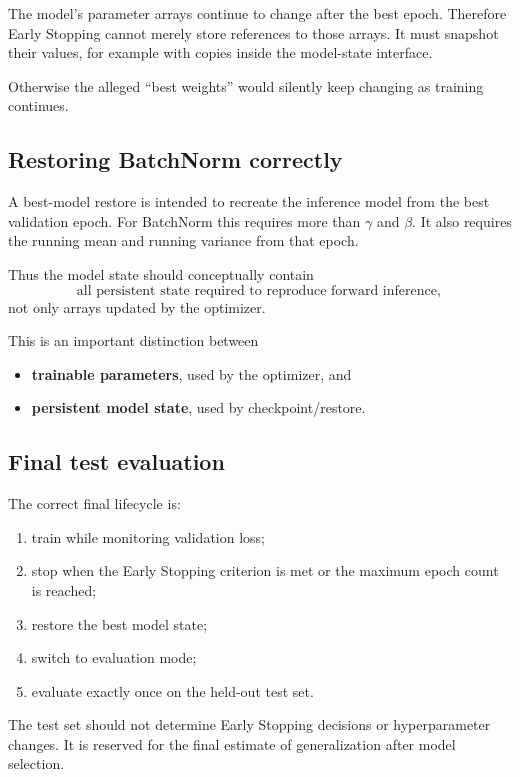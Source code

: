 \documentclass[11pt,a4paper]{article}
\begin{document}
The model's parameter arrays continue to change after the best epoch. Therefore Early Stopping cannot merely store references to those arrays. It must snapshot their values, for example with copies inside the model-state interface.

Otherwise the alleged ``best weights'' would silently keep changing as training continues.

\subsection{Restoring BatchNorm correctly}

A best-model restore is intended to recreate the inference model from the best validation epoch. For BatchNorm this requires more than $\gamma$ and $\beta$. It also requires the running mean and running variance from that epoch.

Thus the model state should conceptually contain
\[
\text{all persistent state required to reproduce forward inference},
\]
not only arrays updated by the optimizer.

This is an important distinction between
\begin{itemize}
    \item \textbf{trainable parameters}, used by the optimizer, and
    \item \textbf{persistent model state}, used by checkpoint/restore.
\end{itemize}

\subsection{Final test evaluation}

The correct final lifecycle is:
\begin{enumerate}[leftmargin=2em]
    \item train while monitoring validation loss;
    \item stop when the Early Stopping criterion is met or the maximum epoch count is reached;
    \item restore the best model state;
    \item switch to evaluation mode;
    \item evaluate exactly once on the held-out test set.
\end{enumerate}

The test set should not determine Early Stopping decisions or hyperparameter changes. It is reserved for the final estimate of generalization after model selection.
\end{document}
